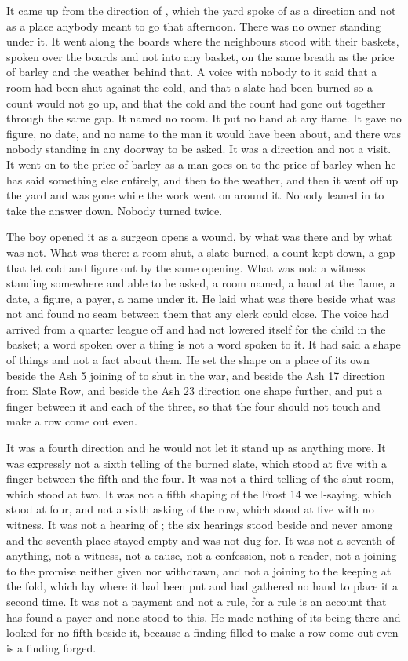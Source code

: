 It came up from the direction of , which the yard spoke of as a direction and not as a place anybody meant to go that afternoon. There was no owner standing under it. It went along the boards where the neighbours stood with their baskets, spoken over the boards and not into any basket, on the same breath as the price of barley and the weather behind that. A voice with nobody to it said that a room had been shut against the cold, and that a slate had been burned so a count would not go up, and that the cold and the count had gone out together through the same gap. It named no room. It put no hand at any flame. It gave no figure, no date, and no name to the man it would have been about, and there was nobody standing in any doorway to be asked. It was a direction and not a visit. It went on to the price of barley as a man goes on to the price of barley when he has said something else entirely, and then to the weather, and then it went off up the yard and was gone while the work went on around it. Nobody leaned in to take the answer down. Nobody turned twice.

The boy opened it as a surgeon opens a wound, by what was there and by what was not. What was there: a room shut, a slate burned, a count kept down, a gap that let cold and figure out by the same opening. What was not: a witness standing somewhere and able to be asked, a room named, a hand at the flame, a date, a figure, a payer, a name under it. He laid what was there beside what was not and found no seam between them that any clerk could close. The voice had arrived from a quarter league off and had not lowered itself for the child in the basket; a word spoken over a thing is not a word spoken to it. It had said a shape of things and not a fact about them. He set the shape on a place of its own beside the Ash 5 joining of  to  shut in the war, and beside the Ash 17 direction from Slate Row, and beside the Ash 23 direction one shape further, and put a finger between it and each of the three, so that the four should not touch and make a row come out even.

It was a fourth direction and he would not let it stand up as anything more. It was expressly not a sixth telling of the burned slate, which stood at five with a finger between the fifth and the four. It was not a third telling of the shut room, which stood at two. It was not a fifth shaping of the Frost 14 well-saying, which stood at four, and not a sixth asking of the row, which stood at five with no witness. It was not a hearing of ; the six hearings stood beside and never among and the seventh place stayed empty and was not dug for. It was not a seventh of anything, not a witness, not a cause, not a confession, not a reader, not a joining to the promise neither given nor withdrawn, and not a joining to the keeping at the fold, which lay where it had been put and had gathered no hand to place it a second time. It was not a payment and not a rule, for a rule is an account that has found a payer and none stood to this. He made nothing of its being there and looked for no fifth beside it, because a finding filled to make a row come out even is a finding forged.

